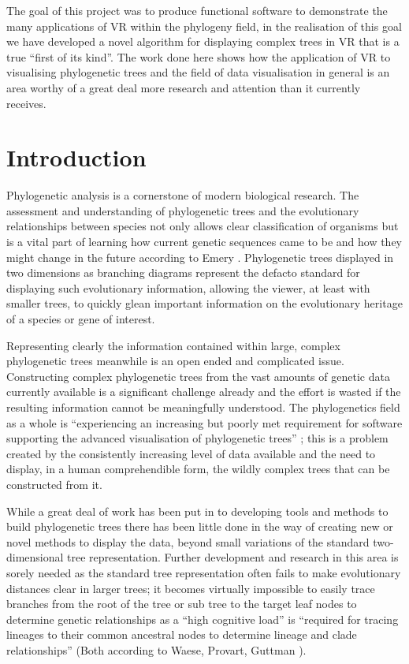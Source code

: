 \documentclass[10pt,letterpaper]{article}
\begin{document}
The goal of this project was to produce functional software to demonstrate the many applications of VR within the phylogeny field, in the realisation of this goal we have developed a novel algorithm for displaying complex trees in VR that is a true “first of its kind”. The work done here shows how the application of VR to visualising phylogenetic trees and the field of data visualisation in general is an area worthy of a great deal more research and attention than it currently receives.

\linenumbers

\section*{Introduction}
Phylogenetic analysis is a cornerstone of modern biological research. The assessment and understanding of phylogenetic trees and the evolutionary relationships between species not only allows clear classification of organisms but is a vital part of learning how current genetic sequences came to be and how they might change in the future according to Emery \cite{bib1}. Phylogenetic trees displayed in two dimensions as branching diagrams represent the defacto standard for displaying such evolutionary information, allowing the viewer, at least with smaller trees, to quickly glean important information on the evolutionary heritage of a species or gene of interest.

Representing clearly the information contained within large, complex phylogenetic trees meanwhile is an open ended and complicated issue. Constructing complex phylogenetic trees from the vast amounts of genetic data currently available is a significant challenge already and the effort is wasted if the resulting information cannot be meaningfully understood. The phylogenetics field as a whole is “experiencing an increasing but poorly met requirement for software supporting the advanced visualisation of phylogenetic trees” \cite{bib2}; this is a problem created by the consistently increasing level of data available and the need to display, in a human comprehendible form, the wildly complex trees that can be constructed from it. 

While a great deal of work has been put in to developing tools and methods to build phylogenetic trees there has been little done in the way of creating new or novel methods to display the data, beyond small variations of the standard two-dimensional tree representation. Further development and research in this area is sorely needed as the standard tree representation often fails to make evolutionary distances clear in larger trees; it becomes virtually impossible to easily trace branches from the root of the tree or sub tree to the target leaf nodes to determine genetic relationships as a “high cognitive load” is “required for tracing lineages to their common ancestral nodes to determine lineage and clade relationships” (Both according to Waese, Provart, Guttman \cite{bib3}).
\end{document}
